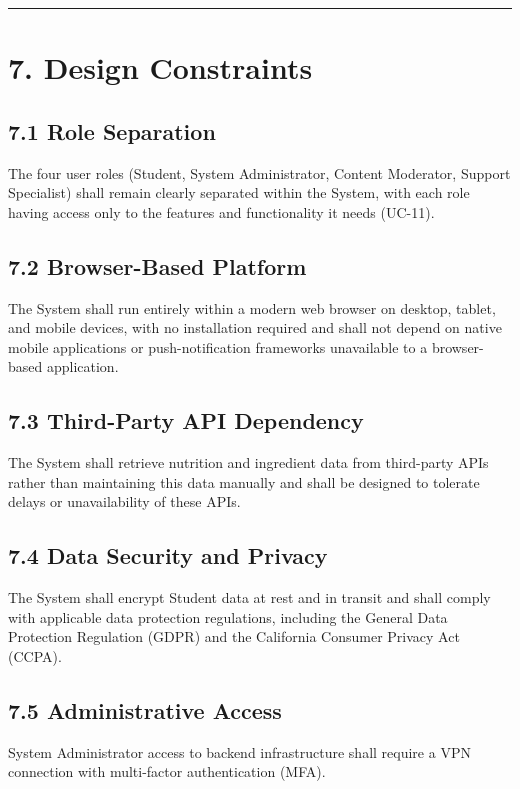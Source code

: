 \documentclass[10pt,letterpaper]{article}
\newcommand{\ucseparator}{\vspace{1em}\noindent\rule{\linewidth}{0.4pt}\vspace{1.5em}}
\begin{document}
\ucseparator

\section*{7. Design Constraints}

\subsection*{7.1 Role Separation}
The four user roles (Student, System Administrator, Content Moderator, Support Specialist) shall remain clearly separated within the System, with each role having access only to the features and functionality it needs (UC-11).

\subsection*{7.2 Browser-Based Platform}
The System shall run entirely within a modern web browser on desktop, tablet, and mobile devices, with no installation required and shall not depend on native mobile applications or push-notification frameworks unavailable to a browser-based application.

\subsection*{7.3 Third-Party API Dependency}
The System shall retrieve nutrition and ingredient data from third-party APIs rather than maintaining this data manually and shall be designed to tolerate delays or unavailability of these APIs.

\subsection*{7.4 Data Security and Privacy}
The System shall encrypt Student data at rest and in transit and shall comply with applicable data protection regulations, including the General Data Protection Regulation (GDPR) and the California Consumer Privacy Act (CCPA).

\subsection*{7.5 Administrative Access}
System Administrator access to backend infrastructure shall require a VPN connection with multi-factor authentication (MFA).
\end{document}
